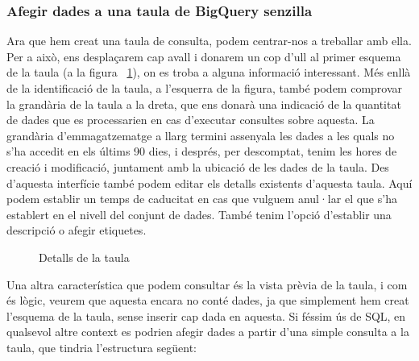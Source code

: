 \documentclass[11pt,longbibliography]{article}
\theoremstyle{definition}
\theoremstyle{remark}
\begin{document}
\subsubsection{Afegir dades a una taula de BigQuery senzilla}

Ara que hem creat una taula de consulta, podem centrar-nos a treballar amb ella. Per a això, ens desplaçarem cap avall i donarem un cop d'ull al primer esquema de la taula (a la figura ~\ref{fig:bq9}), on es troba a alguna informació interessant. Més enllà de la identificació de la taula, a l'esquerra de la figura, també podem comprovar la grandària de la taula a la dreta, que ens donarà una indicació de la quantitat de dades que es processarien en cas d'executar consultes sobre aquesta. La grandària d'emmagatzematge a llarg termini assenyala les dades a les quals no s'ha accedit en els últims 90 dies, i després, per descomptat, tenim les hores de creació i modificació, juntament amb la ubicació de les dades de la taula. Des d'aquesta interfície també podem editar els detalls existents d'aquesta taula. Aquí podem establir un temps de caducitat en cas que vulguem anul·lar el que s'ha establert en el nivell del conjunt de dades. També tenim l'opció d'establir una descripció o afegir etiquetes.


\begin{figure}[h!]
\par
{}%
\hfill
{}%
\par

\caption{Detalls de la taula}
\label{fig:bq9}
\end{figure}


Una altra característica que podem consultar és la vista prèvia de la taula, i com és lògic, veurem que aquesta encara no conté dades, ja que simplement hem creat l'esquema de la taula, sense inserir cap dada en aquesta. Si féssim ús de SQL, en qualsevol altre context es podrien afegir dades a partir d'una simple consulta a la taula, que tindria l'estructura següent:
\end{document}
